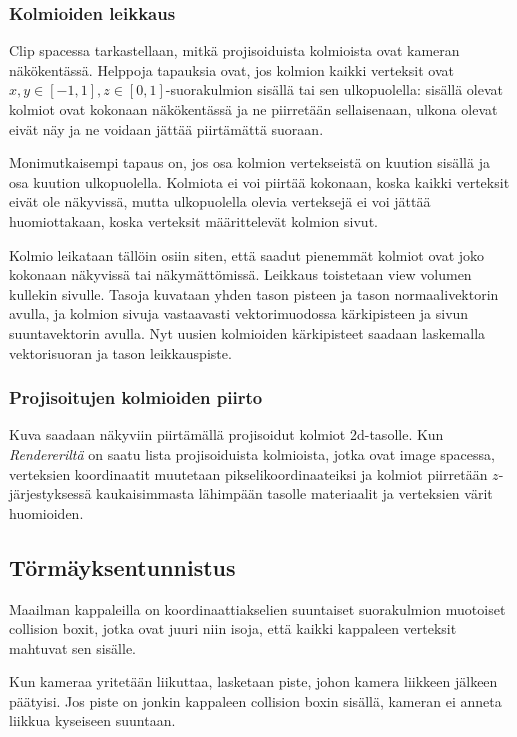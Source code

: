 \documentclass[12pt] {article}
\begin{document}
\subsubsection {Kolmioiden leikkaus}

Clip spacessa tarkastellaan, mitkä projisoiduista kolmioista ovat kameran näkökentässä. Helppoja tapauksia ovat, jos kolmion kaikki verteksit ovat $x, y \in [-1, 1], z \in [0, 1]$-suorakulmion sisällä tai sen ulkopuolella: sisällä olevat kolmiot ovat kokonaan näkökentässä ja ne piirretään sellaisenaan, ulkona olevat eivät näy ja ne voidaan jättää piirtämättä suoraan.

Monimutkaisempi tapaus on, jos osa kolmion vertekseistä on kuution sisällä ja osa kuution ulkopuolella. Kolmiota ei voi piirtää kokonaan, koska kaikki verteksit eivät ole näkyvissä, mutta ulkopuolella olevia verteksejä ei voi jättää huomiottakaan, koska verteksit määrittelevät kolmion sivut.

Kolmio leikataan tällöin osiin siten, että saadut pienemmät kolmiot ovat joko kokonaan näkyvissä tai näkymättömissä. Leikkaus toistetaan view volumen kullekin sivulle. Tasoja kuvataan yhden tason pisteen ja tason normaalivektorin avulla, ja kolmion sivuja vastaavasti vektorimuodossa kärkipisteen ja sivun suuntavektorin avulla. Nyt uusien kolmioiden kärkipisteet saadaan laskemalla vektorisuoran ja tason leikkauspiste.

\subsubsection {Projisoitujen kolmioiden piirto}

Kuva saadaan näkyviin piirtämällä projisoidut kolmiot 2d-tasolle. Kun \textit{Rendereriltä} on saatu lista projisoiduista kolmioista, jotka ovat image spacessa, verteksien koordinaatit muutetaan pikselikoordinaateiksi ja kolmiot piirretään $z$-järjestyksessä kaukaisimmasta lähimpään tasolle materiaalit ja verteksien värit huomioiden.

\subsection {Törmäyksentunnistus}

Maailman kappaleilla on koordinaattiakselien suuntaiset suorakulmion muotoiset collision boxit, jotka ovat juuri niin isoja, että kaikki kappaleen verteksit mahtuvat sen sisälle.

Kun kameraa yritetään liikuttaa, lasketaan piste, johon kamera liikkeen jälkeen päätyisi. Jos piste on jonkin kappaleen collision boxin sisällä, kameran ei anneta liikkua kyseiseen suuntaan.
\end{document}
